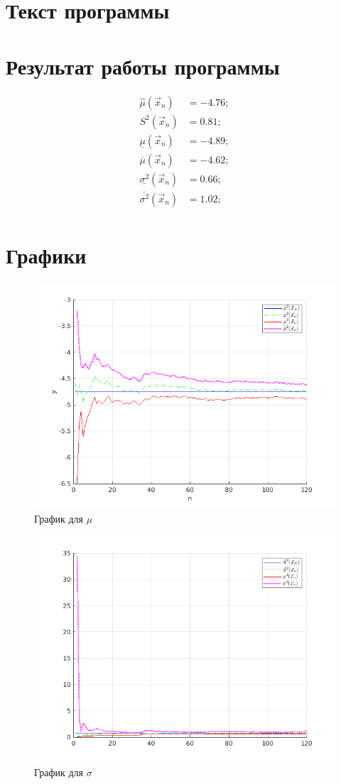 \section{Текст программы}




\section{Результат работы программы}
\begin{align*}
	\hat\mu(\vec x_n) &= -4.76; \\
	S^2(\vec x_n)     &= 0.81;  \\
	\underline{\mu}(\vec x_n) &= -4.89; \\
	\overline{\mu}(\vec x_n) &= -4.62; \\
	\underline{\sigma^2}(\vec x_n) &= 0.66; \\
	\overline{\sigma^2}(\vec x_n) &= 1.02; \\
\end{align*}

\pagebreak
\section{Графики}
\begin{figure}[h!]
	\centering
	\includegraphics{../img/figure21}
	\caption{График для $\mu$}
\end{figure}

\begin{figure}[h]
	\centering
	\includegraphics{../img/figure22}
	\caption{График для $\sigma$}
\end{figure}